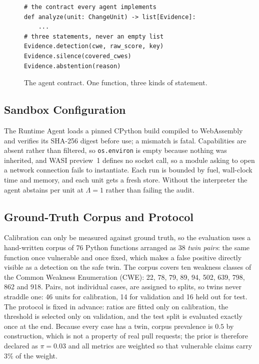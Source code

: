 \documentclass[conference]{IEEEtran}
\begin{document}
\begin{figure}[t]
\centering
\footnotesize
\begin{verbatim}
# the contract every agent implements
def analyze(unit: ChangeUnit) -> list[Evidence]:
    ...
# three statements, never an empty list
Evidence.detection(cwe, raw_score, key)
Evidence.silence(covered_cwes)
Evidence.abstention(reason)
\end{verbatim}
\caption{The agent contract. One function, three kinds of statement.}
\label{fig:contract}
\end{figure}

\subsection{Sandbox Configuration}
The Runtime Agent loads a pinned CPython build compiled to WebAssembly and
verifies its SHA-256 digest before use; a mismatch is fatal. Capabilities
are absent rather than filtered, so \texttt{os.environ} is empty because
nothing was inherited, and WASI preview~1 defines no socket call, so a
module asking to open a network connection fails to instantiate. Each run
is bounded by fuel, wall-clock time and memory, and each unit gets a fresh
store. Without the interpreter the agent abstains per unit at $\Lambda=1$
rather than failing the audit.

\subsection{Ground-Truth Corpus and Protocol}
Calibration can only be measured against ground truth, so the evaluation
uses a hand-written corpus of 76 Python functions arranged as 38
\emph{twin pairs}: the same function once vulnerable and once fixed, which
makes a false positive directly visible as a detection on the safe twin.
The corpus covers ten weakness classes of the Common Weakness Enumeration
(CWE): 22, 78, 79, 89, 94, 502, 639, 798, 862 and 918. Pairs, not
individual cases, are assigned to splits, so twins never straddle one: 46
units for calibration, 14 for validation and 16 held out for test. The
protocol is fixed in advance: ratios are fitted only on calibration, the
threshold is selected only on validation, and the test split is evaluated
exactly once at the end. Because every case has a twin, corpus prevalence
is $0.5$ by construction, which is not a property of real pull requests;
the prior is therefore declared as $\pi=0.03$ and all metrics are weighted
so that vulnerable claims carry $3\%$ of the weight.
\end{document}
